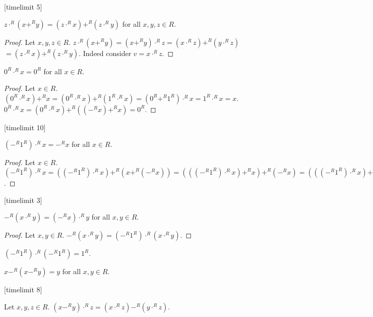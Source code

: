 \documentclass[english,11pt]{article}
\begin{document}
\begin{forthel}

[timelimit 5]
\begin{lemma} 
$z \cdot^{R} (x +^{R} y) = (z \cdot^{R} x) +^{R} (z \cdot^{R} y)$ 
for all $x,y,z \in R$.
\end{lemma}
\begin{proof}
Let $x,y,z \in R$.
$z \cdot^{R} (x +^{R} y) = 
(x +^{R} y) \cdot^{R} z = (x \cdot^{R} z) +^{R} (y \cdot^{R} z)$
$= (z \cdot^{R} x) +^{R} (z \cdot^{R} y)$. 
Indeed consider $v = x \cdot^{R} z$.
\end{proof}

\begin{lemma} $ 0^{R} \cdot^{R} x = 0^{R}$ for all $x \in R$. \end{lemma}
\begin{proof} Let $x \in R$.
$ (0^{R} \cdot^{R} x) +^{R} x = (0^{R} \cdot^{R} x) +^{R} (1^{R} \cdot^{R} x) 
= (0^{R} +^{R} 1^{R}) \cdot^{R} x =  1^{R} \cdot^{R} x = x $.
$ 0^{R} \cdot^{R} x = (0^{R} \cdot^{R} x) +^{R} ((-^{R}x) +^{R} x) = 0^{R}$.
\end{proof}
[timelimit 10]
\begin{lemma}
$ (-^{R} 1^{R}) \cdot^{R} x = -^{R} x$ for all $x \in R$. 
\end{lemma}
\begin{proof}
Let $x \in R$.
$ (-^{R} 1^{R}) \cdot^{R} x = 
((-^{R} 1^{R}) \cdot^{R} x) +^{R} (x +^{R} (-^{R} x)) =
(((-^{R} 1^{R}) \cdot^{R} x) +^{R} x) +^{R} (-^{R} x) =
(((-^{R} 1^{R}) \cdot^{R} x) +^{R} (1^{R} \cdot^{R} x)) +^{R} (-^{R} x)$.
\end{proof}
[timelimit 3]

\begin{lemma}
$-^{R}( x \cdot^{R} y) = (-^{R}  x) \cdot^{R} y$ for all $x,y \in R$.
\end{lemma}
\begin{proof} Let $x,y \in R$.
$-^{R}( x \cdot^{R} y) = (-^{R}1^{R}) \cdot^{R} ( x \cdot^{R} y)$.
\end{proof}

\begin{lemma}
$ (-^{R} 1^{R}) \cdot^{R} (-^{R} 1^{R}) = 1^{R}$.
\end{lemma}

\begin{lemma}
$x -^{R} (x -^{R} y) = y$ for all $x,y \in R$.
\end{lemma}

[timelimit 8]
\begin{lemma}  Let $x,y,z \in R$.
$(x -^{R} y) \cdot^{R} z = (x \cdot^{R} z) -^{R} (y \cdot^{R} z)$.
\end{lemma}


\end{forthel}
\end{document}

